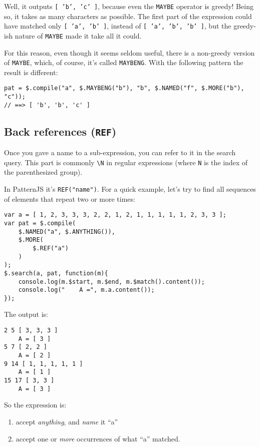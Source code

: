 \documentclass[a4paper,10pt]{article}
\begin{document}
Well, it outputs \texttt{[ 'b', 'c' ]}, because even the \texttt{MAYBE} operator is
greedy!  Being so, it takes as many characters as possible.  The first part
of the expression could have matched only \texttt{[ 'a', 'b' ]}, instead of \texttt{[ 'a', 'b', 'b' ]}, but the greedy-ish nature of \texttt{MAYBE} made it take all it could.

For this reason, even though it seems seldom useful, there is a non-greedy
version of \texttt{MAYBE}, which, of course, it's called \texttt{MAYBENG}.  With the
following pattern the result is different:


\begin{verbatim}
pat = $.compile("a", $.MAYBENG("b"), "b", $.NAMED("f", $.MORE("b"), "c"));
// ==> [ 'b', 'b', 'c' ]
\end{verbatim}
\subsection{Back references (\texttt{REF})}
\label{sec-2-8}


Once you gave a name to a sub-expression, you can refer to it in the search
query.  This part is commonly \texttt{\textbackslash{}N} in regular expressions (where \texttt{N} is the
index of the parenthesized group).

In PatternJS it's \texttt{REF("name")}.  For a quick example, let's try to find all
sequences of elements that repeat two or more times:


\begin{verbatim}
var a = [ 1, 2, 3, 3, 3, 2, 2, 1, 2, 1, 1, 1, 1, 1, 2, 3, 3 ];
var pat = $.compile(
    $.NAMED("a", $.ANYTHING()),
    $.MORE(
        $.REF("a")
    )
);
$.search(a, pat, function(m){
    console.log(m.$start, m.$end, m.$match().content());
    console.log("    A =", m.a.content());
});
\end{verbatim}

The output is:


\begin{verbatim}
2 5 [ 3, 3, 3 ]
    A = [ 3 ]
5 7 [ 2, 2 ]
    A = [ 2 ]
9 14 [ 1, 1, 1, 1, 1 ]
    A = [ 1 ]
15 17 [ 3, 3 ]
    A = [ 3 ]
\end{verbatim}

So the expression is:

\begin{enumerate}
\item accept \emph{anything}, and \emph{name} it “a”
\item accept one or \emph{more} occurrences of what “a” matched.
\end{enumerate}
\end{document}
